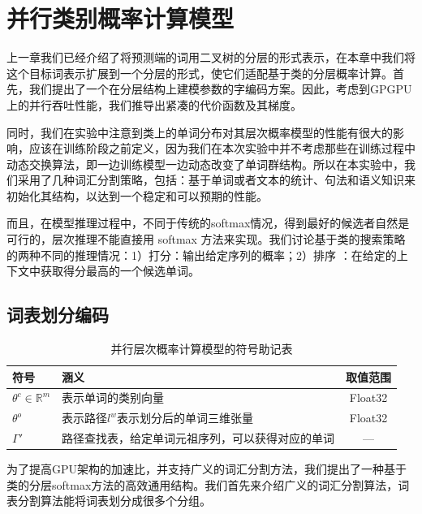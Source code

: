 \chapter{并行类别概率计算模型}
上一章我们已经介绍了将预测端的词用二叉树的分层的形式表示，在本章中我们将这个目标词表示扩展到一个分层的形式，使它们适配基于类的分层概率计算。首先，我们提出了一个在分层结构上建模参数的字编码方案。因此，考虑到GPGPU上的并行吞吐性能，我们推导出紧凑的代价函数及其梯度。

同时，我们在实验中注意到类上的单词分布对其层次概率模型的性能有很大的影响，应该在训练阶段之前定义，因为我们在本次实验中并不考虑那些在训练过程中动态交换算法，即一边训练模型一边动态改变了单词群结构。所以在本实验中，我们采用了几种词汇分割策略，包括：基于单词或者文本的统计、句法和语义知识来初始化其结构，以达到一个稳定和可以预期的性能。

而且，在模型推理过程中，不同于传统的softmax情况，得到最好的候选者自然是可行的，层次推理不能直接用 softmax 方法来实现。我们讨论基于类的搜索策略的两种不同的推理情况：1）打分：输出给定序列的概率；2）排序   ：在给定的上下文中获取得分最高的一个候选单词。


\section{词表划分编码}
\begin{table}[!ht]
  \centering
  \caption{并行层次概率计算模型的符号助记表}
\begin{tabular}{llc}
  \toprule
   符号&涵义&取值范围\\ \midrule
$\theta^c\in\mathbb{R}^m$ &表示单词的类别向量& Float32\\
$ \theta^o$ &表示路径$l^w$表示划分后的单词三维张量&Float32 \\
$\Gamma'$ &路径查找表，给定单词元祖序列，可以获得对应的单词&--- \\
  \bottomrule
\end{tabular}
\end{table}
为了提高GPU架构的加速比，并支持广义的词汇分割方法，我们提出了一种基于类的分层softmax方法的高效通用结构。我们首先来介绍广义的词汇分割算法，词表分割算法能将词表划分成很多个分组。

